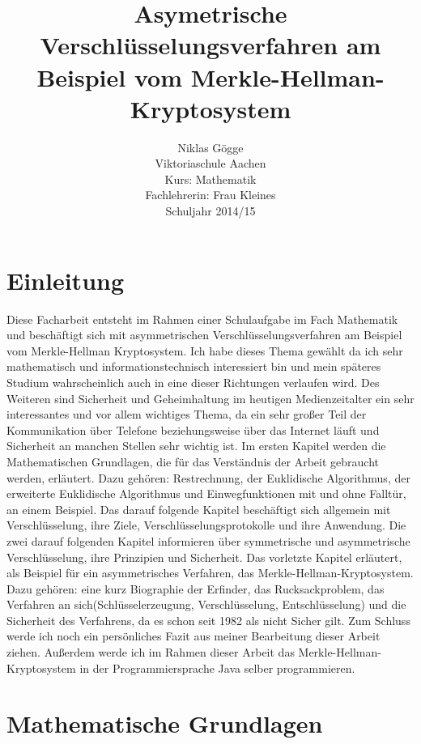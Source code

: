 \documentclass[a4paper,12pt,titlepage]{article}
\author
{
Niklas Gögge\\
Viktoriaschule Aachen\\
Kurs: Mathematik\\
Fachlehrerin: Frau Kleines\\
Schuljahr 2014/15
}
\begin{document}
\title{Asymetrische Verschlüsselungsverfahren am Beispiel vom Merkle-Hellman-Kryptosystem}
\maketitle

\newpage
\tableofcontents
\newpage

\section{Einleitung}
Diese Facharbeit entsteht im Rahmen einer Schulaufgabe im Fach Mathematik und beschäftigt sich mit asymmetrischen Verschlüsselungsverfahren am Beispiel vom Merkle-Hellman Kryptosystem. Ich habe dieses Thema gewählt da ich sehr mathematisch und informationstechnisch interessiert bin und mein späteres Studium wahrscheinlich auch in eine dieser Richtungen verlaufen wird. Des Weiteren sind Sicherheit und Geheimhaltung im heutigen Medienzeitalter ein sehr interessantes und vor allem wichtiges Thema, da ein sehr großer Teil der Kommunikation über Telefone beziehungsweise über das Internet läuft und Sicherheit an manchen Stellen sehr wichtig ist. \newline Im ersten Kapitel werden die Mathematischen Grundlagen, die für das Verständnis der Arbeit gebraucht werden, erläutert. Dazu gehören: Restrechnung, der Euklidische Algorithmus, der erweiterte Euklidische Algorithmus und Einwegfunktionen mit und ohne Falltür, an einem Beispiel. Das darauf folgende Kapitel beschäftigt sich allgemein mit Verschlüsselung, ihre Ziele, Verschlüsselungsprotokolle und ihre Anwendung. Die zwei darauf folgenden Kapitel informieren über symmetrische und asymmetrische Verschlüsselung, ihre Prinzipien und Sicherheit. Das vorletzte Kapitel erläutert, als Beispiel für ein asymmetrisches Verfahren, das Merkle-Hellman-Kryptosystem. Dazu gehören: eine kurz Biographie der Erfinder, das Rucksackproblem, das Verfahren an sich(Schlüsselerzeugung, Verschlüsselung, Entschlüsselung) und die Sicherheit des Verfahrens, da es schon seit 1982 als nicht Sicher gilt. Zum Schluss werde ich noch ein persönliches Fazit aus meiner Bearbeitung dieser Arbeit ziehen. Außerdem werde ich im Rahmen dieser Arbeit das Merkle-Hellman-Kryptosystem in der Programmiersprache Java selber programmieren.
\newpage 

\section{Mathematische Grundlagen}
\end{document}
